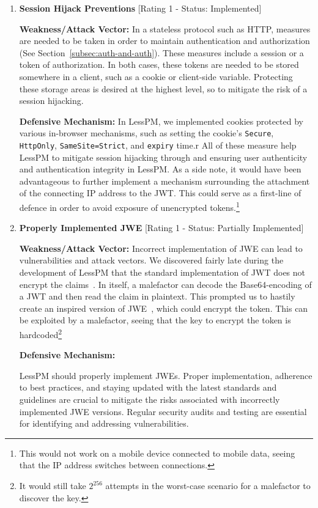 \begin{enumerate}[label=$\blacktriangleright$]
  \item \textbf{Session Hijack Preventions} [Rating 1 - Status: Implemented]

  \textbf{Weakness/Attack Vector:}
  In a stateless protocol such as HTTP, measures are needed to be taken in
  order to maintain authentication and authorization (See
  Section~\ref{subsec:auth-and-auth}).
  These measures include a session or a token of authorization.
  In both cases, these tokens are needed to be stored somewhere in a client,
  such as a cookie or client-side variable.
  Protecting these storage areas is desired at the highest level, so to
  mitigate the risk of a session hijacking.

  \textbf{Defensive Mechanism:}
  In LessPM, we implemented cookies protected by various in-browser
  mechanisms, such as setting the cookie's \texttt{Secure}, \texttt{HttpOnly},
  \texttt{SameSite=Strict}, and \texttt{expiry} time.r
  All of these measure help LessPM to mitigate session hijacking through and
  ensuring user authenticity and authentication integrity in LessPM\@.
  As a side note, it would have been advantageous to further implement a
  mechanism surrounding the attachment of the connecting IP address to the
  JWT\@.
  This could serve as a first-line of defence in order to avoid exposure of
  unencrypted tokens.\footnote{
    This would not work on a mobile device connected to mobile data,
    seeing that the IP address switches between connections.
  }

  \item \textbf{Properly Implemented JWE} [Rating 1 - Status: Partially
  Implemented]

  \textbf{Weakness/Attack Vector:}
  Incorrect implementation of JWE can lead to vulnerabilities and attack
  vectors.
  We discovered fairly late during the development of LessPM that the
  standard implementation of JWT does not encrypt the claims~\cite{RFC7519}.
  In itself, a malefactor can decode the Base64-encoding of a JWT and then
  read the claim in plaintext.
  This prompted us to hastily create an inspired version of JWE~\cite{rfc7516
  }, which could encrypt the token.
  This can be exploited by a malefactor, seeing that the key to encrypt the
  token is hardcoded\footnote{
    It would still take $2^{256}$ attempts in the worst-case scenario for a
    malefactor to discover the key.
  }

  \textbf{Defensive Mechanism:}

  LessPM should properly implement JWEs.
  Proper implementation, adherence to best practices, and staying updated with
  the latest standards and guidelines are crucial to mitigate the risks
  associated with incorrectly implemented JWE versions.
  Regular security audits and testing are essential for identifying and
  addressing vulnerabilities.
  

\end{enumerate}
